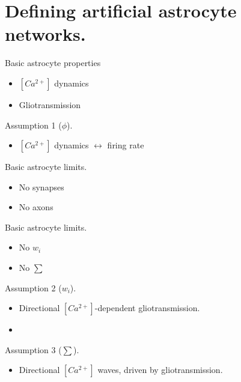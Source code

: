 \documentclass[10pt]{beamer}
\begin{document}
\section[AANs]{Defining artificial astrocyte networks.}

\begin{frame}[fragile]{Basic astrocyte properties}
\begin{itemize}
    \item $[Ca^{2+}]$ dynamics
    \item Gliotransmission
\end{itemize}
\end{frame}

\begin{frame}[fragile]{Assumption 1 ($\phi$).}
\begin{itemize}
    \item $[Ca^{2+}]$ dynamics $\leftrightarrow$ firing rate
\end{itemize}
\end{frame}

\begin{frame}[fragile]{Basic astrocyte limits.}
\begin{itemize}
    \item No synapses
    \item No axons 
\end{itemize}
\end{frame}

\begin{frame}[fragile]{Basic astrocyte limits.}
\begin{itemize}
    \item No $w_i$
    \item No $\sum$
\end{itemize}
\end{frame}

\begin{frame}[fragile]{Assumption 2 ($w_i$).}
\begin{itemize}
    \item \alert{Directional} $[Ca^{2+}]$-dependent gliotransmission.
    \item 
\end{itemize}
\end{frame}
\begin{frame}[fragile]{Assumption 3 ($\sum$).}
\begin{itemize}
    \item \alert{Directional} $[Ca^{2+}]$ waves, driven by gliotransmission.
\end{itemize}
\end{frame}
\end{document}
